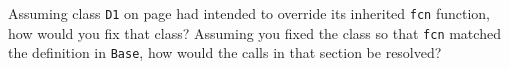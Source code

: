 %
%
\begin{question}
Assuming class \verb|D1| on page \pageref{lst:the definition of base d1 and d2} had intended to override
its inherited \verb|fcn| function, how would you fix that class? Assuming you fixed
the class so that \verb|fcn| matched the definition in \verb|Base|, how would the calls in
that section be resolved?
\end{question}
